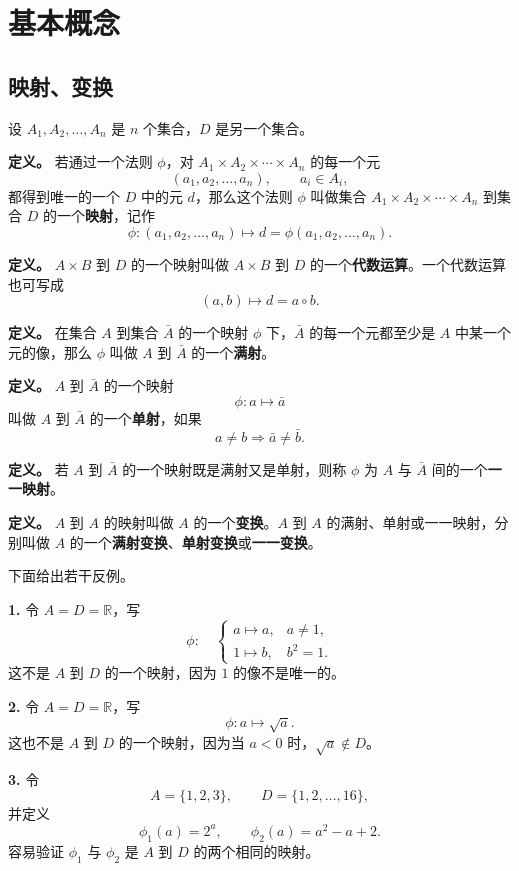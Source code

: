 \chapter{基本概念}

\section{映射、变换}

设 $A_1,A_2,\ldots,A_n$ 是 $n$ 个集合，$D$ 是另一个集合。

\textbf{定义。} 若通过一个法则 $\phi$，对 $A_1\times A_2\times\cdots\times A_n$ 的每一个元
\[
(a_1,a_2,\ldots,a_n),\qquad a_i\in A_i,
\]
都得到唯一的一个 $D$ 中的元 $d$，那么这个法则 $\phi$ 叫做集合 $A_1\times A_2\times\cdots\times A_n$ 到集合 $D$ 的一个\textbf{映射}，记作
\[
\phi:(a_1,a_2,\ldots,a_n)\longmapsto d=\phi(a_1,a_2,\ldots,a_n).
\]

\textbf{定义。} $A\times B$ 到 $D$ 的一个映射叫做 $A\times B$ 到 $D$ 的一个\textbf{代数运算}。一个代数运算也可写成
\[
(a,b)\longmapsto d=a\circ b.
\]

\textbf{定义。} 在集合 $A$ 到集合 $\bar A$ 的一个映射 $\phi$ 下，$\bar A$ 的每一个元都至少是 $A$ 中某一个元的像，那么 $\phi$ 叫做 $A$ 到 $\bar A$ 的一个\textbf{满射}。

\textbf{定义。} $A$ 到 $\bar A$ 的一个映射
\[
\phi:a\longmapsto \bar a
\]
叫做 $A$ 到 $\bar A$ 的一个\textbf{单射}，如果
\[
a\ne b\Longrightarrow \bar a\ne\bar b.
\]

\textbf{定义。} 若 $A$ 到 $\bar A$ 的一个映射既是满射又是单射，则称 $\phi$ 为 $A$ 与 $\bar A$ 间的一个\textbf{一一映射}。

\textbf{定义。} $A$ 到 $A$ 的映射叫做 $A$ 的一个\textbf{变换}。$A$ 到 $A$ 的满射、单射或一一映射，分别叫做 $A$ 的一个\textbf{满射变换}、\textbf{单射变换}或\textbf{一一变换}。

下面给出若干反例。

\textbf{1.} 令 $A=D=\mathbb R$，写
\[
\phi:\quad
\begin{cases}
a\longmapsto a,&a\ne1,\\
1\longmapsto b,&b^2=1.
\end{cases}
\]
这不是 $A$ 到 $D$ 的一个映射，因为 $1$ 的像不是唯一的。

\textbf{2.} 令 $A=D=\mathbb R$，写
\[
\phi:a\longmapsto\sqrt a.
\]
这也不是 $A$ 到 $D$ 的一个映射，因为当 $a<0$ 时，$\sqrt a\notin D$。

\textbf{3.} 令
\[
A=\{1,2,3\},\qquad D=\{1,2,\ldots,16\},
\]
并定义
\[
\phi_1(a)=2^a,\qquad \phi_2(a)=a^2-a+2.
\]
容易验证 $\phi_1$ 与 $\phi_2$ 是 $A$ 到 $D$ 的两个相同的映射。

